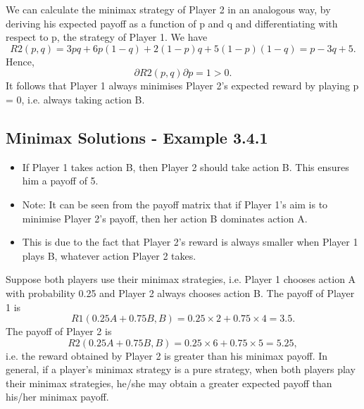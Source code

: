 \documentclass[]{report}
\begin{document}
We can calculate the minimax strategy of Player 2 in an analogous
way, by deriving his expected payoff as a function of p and q and
differentiating with respect to p, the strategy of Player 1. We have
\[R2(p, q) = 3pq+6p(1−q)+2(1−p)q+5(1−p)(1−q) = p−3q+5.\]
Hence,
\[∂R2(p, q)
∂p
= 1 > 0.\]
It follows that Player 1 always minimises Player 2’s expected
reward by playing p = 0, i.e. always taking action B.
\subsection{Minimax Solutions - Example 3.4.1}
\begin{itemize}
	\item If Player 1 takes action B, then Player 2 should take action B.
	This ensures him a payoff of 5.
	\item Note: It can be seen from the payoff matrix that if Player 1’s aim
	is to minimise Player 2’s payoff, then her action B dominates
	action A.
	\item This is due to the fact that Player 2’s reward is always smaller
	when Player 1 plays B, whatever action Player 2 takes.
\end{itemize}

Suppose both players use their minimax strategies, i.e. Player 1
chooses action A with probability 0.25 and Player 2 always chooses
action B.
The payoff of Player 1 is
\[R1(0.25A + 0.75B, B) = 0.25 × 2 + 0.75 × 4 = 3.5.\]
The payoff of Player 2 is
\[R2(0.25A + 0.75B, B) = 0.25 × 6 + 0.75 × 5 = 5.25,\] i.e. the
reward obtained by Player 2 is greater than his minimax payoff.
In general, if a player’s minimax strategy is a pure strategy, when
both players play their minimax strategies, he/she may obtain a
greater expected payoff than his/her minimax payoff.
\end{document}
